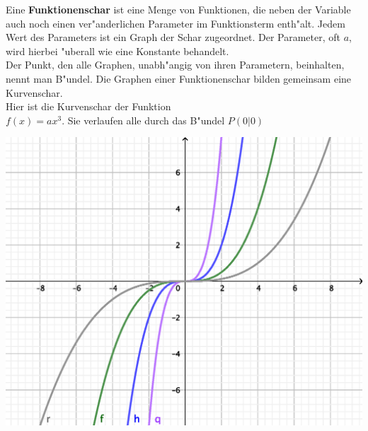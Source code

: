 \begin{minipage}[b]{0.5\linewidth}
Eine \textbf{Funktionenschar} ist eine Menge von Funktionen, die neben der Variable auch noch einen ver"anderlichen Parameter im Funktionsterm enth"alt. Jedem Wert des Parameters ist ein Graph der Schar zugeordnet. Der Parameter, oft $a$, wird hierbei "uberall wie eine Konstante behandelt.\\
Der Punkt, den alle Graphen, unabh"angig von ihren Parametern, beinhalten, nennt man B"undel. Die Graphen einer
Funktionenschar bilden gemeinsam eine Kurvenschar.\\
Hier ist die Kurvenschar der Funktion\\ $f(x)=ax^3$. Sie verlaufen alle durch das B"undel $P(0|0)$
\end{minipage}
\hfill
\begin{minipage}[b]{0.4\linewidth}
\includegraphics[height=12\baselineskip]{kap3/BundelFunktionenscharen.eps}
\end{minipage}
